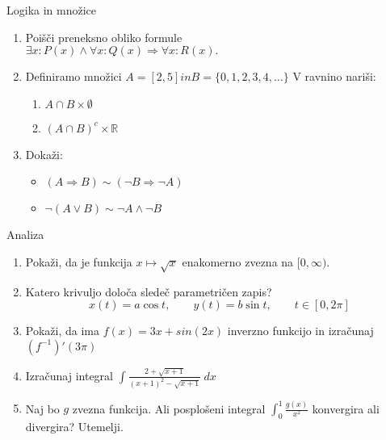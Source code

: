 \begin{frame}{Logika in množice}
	\begin{enumerate}
		\item
		Poišči preneksno obliko formule\\ %
		$\exists x : P(x) \land \forall x : Q(x) \Rightarrow \forall x:R(x).$
		\item 
		Definiramo množici $A=[2,5] in B=\{0,1,2,3,4,\ldots\} $%
		V ravnino nariši:
		\begin{enumerate}
		   \item $A \cap B \times \emptyset$
		   \item $(A \cap B)^c\times \mathbb{R}$
		\end{enumerate}
		\item
		Dokaži:
		\begin{itemize}
			\item $(A \Rightarrow B) \sim (\lnot B \Rightarrow \lnot A)$
			\item $ \lnot(A \vee B) \sim \lnot A \land \lnot B$
		\end{itemize}
	\end{enumerate}
\end{frame}

\begin{frame}{Analiza}
	\begin{enumerate}
		\item
		Pokaži, da je funkcija $x \mapsto \sqrt{x}$ enakomerno zvezna na $[0,\infty)$.
		\item 
		Katero krivuljo določa sledeč parametričen zapis?
		$$
		   x(t) = a \cos t, \qquad %
		   y(t) = b \sin t, \qquad %
		   t \in [0, 2 \pi]
		$$ 
		\item
		Pokaži, da ima $f(x)=3x+sin(2x)$ inverzno funkcijo in izračunaj $(f^{-1})'(3\pi)$
		
		\item
		Izračunaj integral $\displaystyle \int \frac{2+\sqrt{x+1}}{(x+1)^2 - \sqrt{x+1}} \ dx$ 
		
		\item 
		Naj bo $g$ zvezna funkcija. Ali posplošeni integral 
		$\int_{0}^{1} \frac{g(x)}{x^2}$
		konvergira ali divergira? Utemelji.
	\end{enumerate}
\end{frame}

